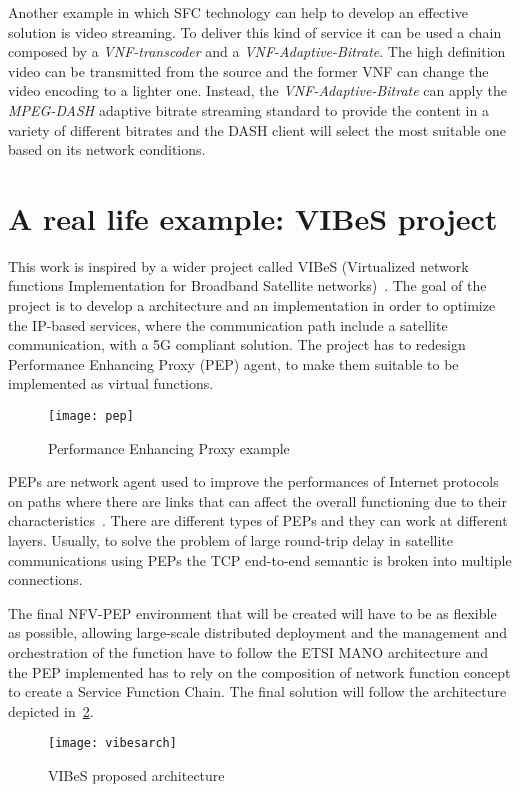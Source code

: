 Another example in which SFC technology can help to develop an effective
solution is video streaming. To deliver this kind of service it can be used a
chain composed by a \emph{VNF-transcoder} and a \emph{VNF-Adaptive-Bitrate}. The
high definition video can be transmitted from the source and the former VNF
can change the video encoding to a lighter one. Instead, the
\emph{VNF-Adaptive-Bitrate} can apply the \emph{MPEG-DASH} adaptive bitrate
streaming standard to provide the content in a variety of different bitrates and
the DASH client will select the most suitable one based on its network
conditions.

\section{A real life example: VIBeS project}
This work is inspired by a wider project called VIBeS (Virtualized network
functions Implementation for Broadband Satellite networks)~\cite{vibesesa}. The
goal of the project is to develop a architecture and an implementation in order
to optimize the IP-based services, where the communication path include a
satellite communication, with a 5G compliant solution. The project has to
redesign Performance Enhancing Proxy (PEP) agent, to make them suitable to be
implemented as virtual functions. 

\begin{figure}[ht]
  \centering
  \texttt{[image: pep]}
  \caption[Performance Enhancing Proxy example]{Performance Enhancing Proxy
  example}
  \label{chap:background:img:pep}
\end{figure}

PEPs are network agent used to improve the performances of Internet protocols on
paths where there are links that can affect the overall functioning due to their
characteristics~\cite{border2001rfc3135}. There are different types of PEPs and
they can work at different layers. Usually, to solve the problem of large
round-trip delay in satellite communications using PEPs the TCP end-to-end
semantic is broken into multiple connections.

The final NFV-PEP environment that will be created will have to be as flexible
as possible, allowing large-scale distributed deployment and the
management and orchestration of the function have to follow the ETSI MANO
architecture and the PEP implemented has to rely on the composition of
network function concept to create a Service Function Chain. The final solution
will follow the architecture depicted in~\ref{chap:background:img:vibesarch}.

\begin{figure}[h]
  \centering
  \texttt{[image: vibesarch]}
  \caption[VIBeS proposed architecture]{VIBeS proposed
  architecture~\cite{vibesesa}}
  \label{chap:background:img:vibesarch}
\end{figure}